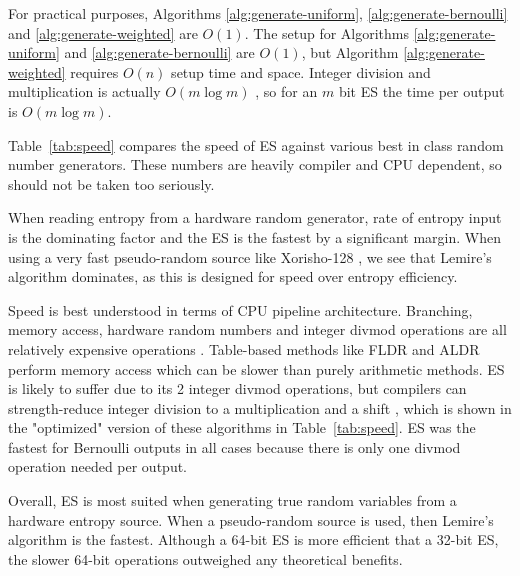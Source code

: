 \documentclass[12pt]{article}
\begin{document}
For practical purposes, Algorithms \ref{alg:generate-uniform}, \ref{alg:generate-bernoulli} and \ref{alg:generate-weighted} are $O(1)$.
The setup for Algorithms \ref{alg:generate-uniform} and \ref{alg:generate-bernoulli} are $O(1)$, but Algorithm \ref{alg:generate-weighted} requires $O(n)$ setup time and space. Integer division and multiplication is actually $O(m \log m)$ \cite{harvey2021integer}, so for an $m$ bit ES the time per output is $O(m \log m)$. 

Table~\ref{tab:speed} compares the speed of ES against various best in class random number generators. These numbers are heavily compiler and CPU dependent, so should not be taken too seriously.

When reading entropy from a hardware random generator, rate of entropy input is the dominating factor and the ES is the fastest by a significant margin. When using a very fast pseudo-random source like Xorisho-128 \cite{blackman21}, we see that Lemire's algorithm \cite{lemire2019fast} dominates, as this is designed for speed over entropy efficiency.

Speed is best understood in terms of CPU pipeline architecture. Branching, memory access, hardware random numbers and integer divmod operations are all relatively expensive operations \cite{Abel19a}. Table-based methods like FLDR \cite{saad2020fldr} and ALDR \cite{saad2025} perform memory access which can be slower than purely arithmetic methods. ES is likely to suffer due to its 2 integer divmod operations, but compilers can strength-reduce integer division to a multiplication and a shift \cite{granlund94}, which is shown in the "optimized" version of these algorithms in Table~\ref{tab:speed}. ES was the fastest for Bernoulli outputs in all cases because there is only one divmod operation needed per output.

Overall, ES is most suited when generating true random variables from a hardware entropy source. When a pseudo-random source is used, then Lemire's algorithm is the fastest. Although a 64-bit ES is more efficient that a 32-bit ES, the slower 64-bit operations outweighed any theoretical benefits.
\end{document}
